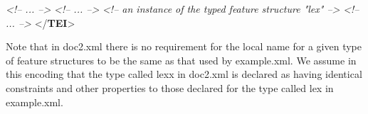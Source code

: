 \begin{shaded}
\hspace*{1em}\hspace*{1em}\hspace*{1em}\mbox{}\newline 
\hspace*{1em}\hspace*{1em}\mbox{}\newline 
\textit{<!-- ... -->}\mbox{}\newline 
\hspace*{1em}\mbox{}\newline 
{}\mbox{}\newline 
{}\mbox{}\newline 
\hspace*{1em}\mbox{}\newline 
\textit{<!-- ... -->}\mbox{}\newline 
\hspace*{1em}\hspace*{1em}\mbox{}\newline 
\textit{<!-- an instance of the typed feature structure "lex" -->}\mbox{}\newline 
\hspace*{1em}\hspace*{1em}\mbox{}\newline 
\textit{<!-- ... -->}\mbox{}\newline 
\hspace*{1em}\mbox{}\newline 
{}\mbox{}\newline 
{</\textbf{TEI}>}\end{shaded}\egroup\par \noindent  Note that in \textsf{doc2.xml} there is no requirement for the local name for a given type of feature structures to be the same as that used by \textsf{example.xml}. We assume in this encoding that the type called  {\name lexx} in \textsf{doc2.xml} is declared as having identical constraints and other properties to those declared for the type called  {\name lex} in \textsf{example.xml}.\par
